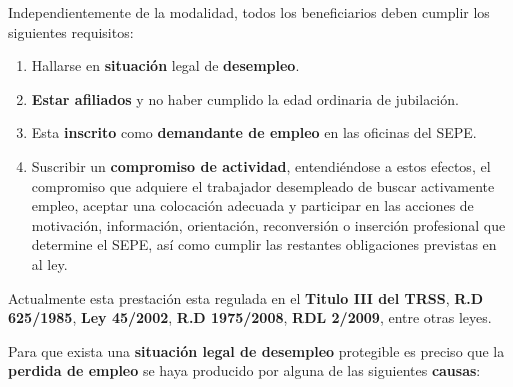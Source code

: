 Independientemente de la modalidad, todos los beneficiarios deben cumplir los siguientes requisitos:

\begin{enumerate}
    \item Hallarse en \textbf{situación} legal de \textbf{desempleo}.
    \item \textbf{Estar afiliados} y no haber cumplido la edad ordinaria de jubilación.
    \item Esta \textbf{inscrito} como \textbf{demandante de empleo} en las oficinas del SEPE.
    \item Suscribir un \textbf{compromiso de actividad}, entendiéndose a estos efectos, el compromiso que adquiere el trabajador desempleado de buscar activamente empleo, aceptar una colocación adecuada y participar en las acciones de motivación, información, orientación, reconversión o inserción profesional que determine el SEPE, así como cumplir las restantes obligaciones previstas en al ley.
\end{enumerate}

Actualmente esta prestación esta regulada en el \textbf{Titulo III del TRSS}, \textbf{R.D 625/1985}, \textbf{Ley 45/2002}, \textbf{R.D 1975/2008}, \textbf{RDL 2/2009}, entre otras leyes.

Para que exista una \textbf{situación legal de desempleo} protegible es preciso que la \textbf{perdida de empleo} se haya producido por alguna de las siguientes \textbf{causas}:


